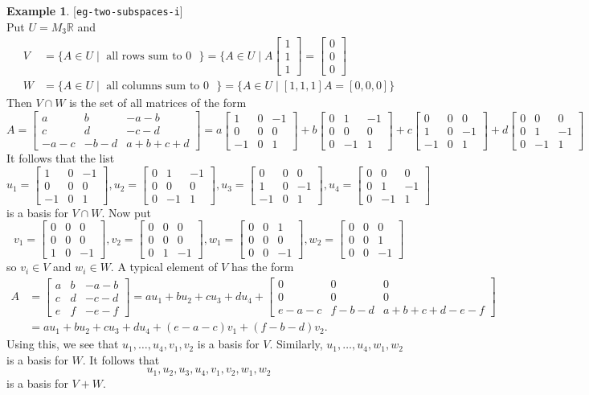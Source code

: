 \documentclass{amsart}
\newcommand{\lbl}[1]{\label{#1}\textup{[\texttt{#1}]}\ \\}
\newcommand{\lbl}{\label}
\newcommand{\R}         {{\mathbb{R}}}
\newcommand{\bsm}       {\left[\begin{smallmatrix}}
\newcommand{\esm}       {\end{smallmatrix}\right]}
\newcommand{\st}        {\;|\;}
\renewcommand{\:}       {\colon}
\theoremstyle{definition}
\newtheorem{example}[theorem]{Example}
\begin{document}
\begin{example}\lbl{eg-two-subspaces-i}
 Put $U=M_3\R$ and
 \begin{align*}
  V &= \{A\in U\st \text{ all rows sum to $0$  }\}
     = \{A\in U\st A\bsm 1\\1\\1\esm =\bsm 0\\0\\0\esm \\
  W &= \{A\in U\st \text{ all columns sum to $0$ }\}
     = \{A\in U \st [1,1,1] A = [0,0,0]\}
 \end{align*}
 Then $V\cap W$ is the set of all matrices of the form
 {\tiny \[
  A = \bsm a&b& -a-b\\ c&d& -c-d\\ -a-c & -b-d & a+b+c+d\esm
  = 
  a \bsm 1&0&-1\\ 0&0&0 \\ -1&0&1 \esm + 
  b \bsm 0&1&-1\\ 0&0&0 \\ 0&-1&1 \esm + 
  c \bsm 0&0&0\\ 1&0&-1 \\ -1&0&1 \esm + 
  d \bsm 0&0&0\\ 0&1&-1 \\ 0&-1&1 \esm 
 \]} 
 It follows that the list
 {\tiny \[
  u_1= \bsm 1&0&-1\\ 0&0&0 \\ -1&0&1 \esm,
  u_2= \bsm 0&1&-1\\ 0&0&0 \\ 0&-1&1 \esm, 
  u_3= \bsm 0&0&0\\ 1&0&-1 \\ -1&0&1 \esm, 
  u_4= \bsm 0&0&0\\ 0&1&-1 \\ 0&-1&1 \esm 
 \]} 
 is a basis for $V\cap W$.  Now put 
 {\tiny \[
   v_1=\bsm 0&0&0\\0&0&0\\1&0&-1\esm,
   v_2=\bsm 0&0&0\\0&0&0\\0&1&-1\esm,
   w_1=\bsm 0&0&1\\0&0&0\\0&0&-1\esm,
   w_2=\bsm 0&0&0\\0&0&1\\0&0&-1\esm
 \]}  
 so $v_i\in V$ and $w_i\in W$.  A typical element of $V$ has
 the form 
 {\tiny \begin{align*}
   A &= \bsm a&b&-a-b\\ c&d&-c-d\\ e&f&-e-f \esm 
      = au_1+bu_2+cu_3+du_4 + 
        \bsm 0&0&0\\ 0&0&0\\ e-a-c&f-b-d&a+b+c+d-e-f \esm \\
     &= au_1+bu_2+cu_3+du_4 + (e-a-c)v_1 + (f-b-d)v_2.
 \end{align*}}
 Using this, we see that $u_1,\dotsc,u_4,v_1,v_2$ is a basis
 for $V$.  Similarly, $u_1,\dotsc,u_4,w_1,w_2$ is a basis
 for $W$.  It follows that 
 \[ u_1,u_2,u_3,u_4,v_1,v_2,w_1,w_2 \]
 is a basis for $V+W$.
\end{example}
\end{document}
